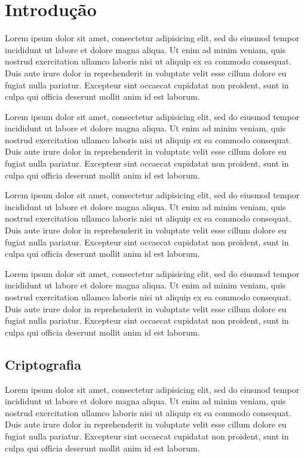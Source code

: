 \documentclass[12pt, a4paper]{ifspcjo}
\begin{document}
	\imprimircapa

	\imprimirfolhaderosto

	\folhadeaprovacaoteste

	\tableofcontents

	\chapter{Introdução}

	Lorem ipsum dolor sit amet, consectetur adipisicing elit, sed do eiusmod
	tempor incididunt ut labore et dolore magna aliqua. Ut enim ad minim veniam,
	quis nostrud exercitation ullamco laboris nisi ut aliquip ex ea commodo
	consequat. Duis aute irure dolor in reprehenderit in voluptate velit esse
	cillum dolore eu fugiat nulla pariatur. Excepteur sint occaecat cupidatat non
	proident, sunt in culpa qui officia deserunt mollit anim id est laborum.

	Lorem ipsum dolor sit amet, consectetur adipisicing elit, sed do eiusmod
	tempor incididunt ut labore et dolore magna aliqua. Ut enim ad minim veniam,
	quis nostrud exercitation ullamco laboris nisi ut aliquip ex ea commodo
	consequat. Duis aute irure dolor in reprehenderit in voluptate velit esse
	cillum dolore eu fugiat nulla pariatur. Excepteur sint occaecat cupidatat non
	proident, sunt in culpa qui officia deserunt mollit anim id est laborum.

	Lorem ipsum dolor sit amet, consectetur adipisicing elit, sed do eiusmod
	tempor incididunt ut labore et dolore magna aliqua. Ut enim ad minim veniam,
	quis nostrud exercitation ullamco laboris nisi ut aliquip ex ea commodo
	consequat. Duis aute irure dolor in reprehenderit in voluptate velit esse
	cillum dolore eu fugiat nulla pariatur. Excepteur sint occaecat cupidatat non
	proident, sunt in culpa qui officia deserunt mollit anim id est laborum.

	Lorem ipsum dolor sit amet, consectetur adipisicing elit, sed do eiusmod
	tempor incididunt ut labore et dolore magna aliqua. Ut enim ad minim veniam,
	quis nostrud exercitation ullamco laboris nisi ut aliquip ex ea commodo
	consequat. Duis aute irure dolor in reprehenderit in voluptate velit esse
	cillum dolore eu fugiat nulla pariatur. Excepteur sint occaecat cupidatat non
	proident, sunt in culpa qui officia deserunt mollit anim id est laborum.

	\section{Criptografia}

	Lorem ipsum dolor sit amet, consectetur adipisicing elit, sed do eiusmod
	tempor incididunt ut labore et dolore magna aliqua. Ut enim ad minim veniam,
	quis nostrud exercitation ullamco laboris nisi ut aliquip ex ea commodo
	consequat. Duis aute irure dolor in reprehenderit in voluptate velit esse
	cillum dolore eu fugiat nulla pariatur. Excepteur sint occaecat cupidatat non
	proident, sunt in culpa qui officia deserunt mollit anim id est laborum.
\end{document}

